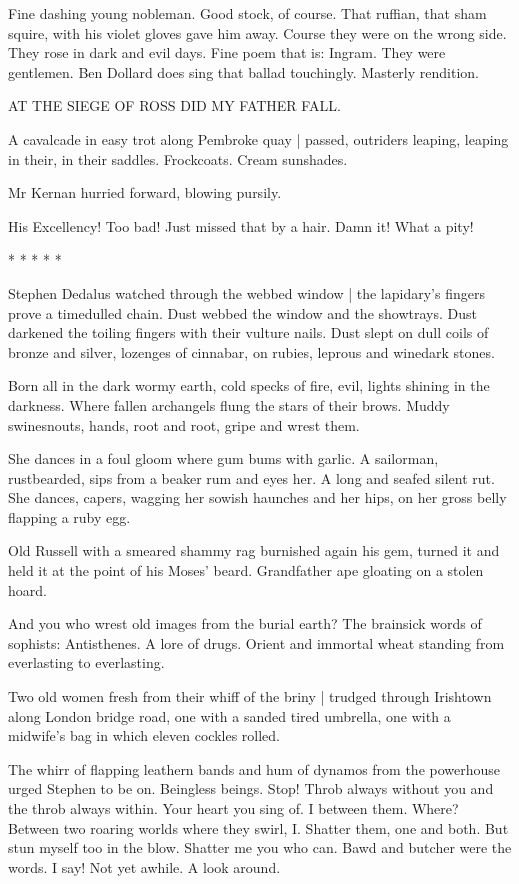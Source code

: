 Fine dashing young nobleman.
Good stock, of course.
That ruffian, that sham squire, with his violet gloves gave him away.
Course they were on the wrong side.
They rose in dark and evil days.
Fine poem that is:
Ingram.
They were gentlemen.
Ben Dollard does sing that ballad touchingly.
Masterly rendition.


    AT THE SIEGE OF ROSS DID MY FATHER FALL.


A cavalcade in easy trot along Pembroke quay |
passed, outriders leaping, leaping in their, in their saddles.
Frockcoats.
Cream sunshades.

Mr Kernan hurried forward, blowing pursily.

His Excellency!
Too bad!
Just missed that by a hair.
Damn it!
What a pity!


    * * * * *


Stephen Dedalus watched through the webbed window |
the lapidary's fingers prove a timedulled chain.
Dust webbed the window and the showtrays.
Dust darkened the toiling fingers with their vulture nails.
Dust slept on dull coils of bronze and silver,
lozenges of cinnabar,
on rubies,
leprous and winedark stones.

Born all in the dark wormy earth,
cold specks of fire,
evil, lights shining in the darkness.
Where fallen archangels flung the stars of their brows.
Muddy swinesnouts,
hands, root and root,
gripe and wrest them.

She dances in a foul gloom where gum bums with garlic.
A sailorman, rustbearded, sips from a beaker rum and eyes her.
A long and seafed silent rut.
She dances, capers,
wagging her sowish haunches and her hips,
on her gross belly flapping a ruby egg.

Old Russell with a smeared shammy rag burnished again his gem,
turned it
and held it at the point of his Moses' beard.
Grandfather ape gloating on a stolen hoard.

And you who wrest old images from the burial earth?
The brainsick words of sophists:
Antisthenes.
A lore of drugs.
Orient and immortal wheat standing from everlasting to everlasting.

Two old women fresh from their whiff of the briny |
trudged through Irishtown along London bridge road,
one with a sanded tired umbrella,
one with a midwife's bag
in which eleven cockles rolled.

The whirr of flapping leathern bands and hum of dynamos from the
powerhouse urged Stephen to be on. Beingless beings. Stop! Throb always
without you and the throb always within. Your heart you sing of. I
between them. Where? Between two roaring worlds where they swirl, I.
Shatter them, one and both. But stun myself too in the blow. Shatter me
you who can. Bawd and butcher were the words. I say! Not yet awhile. A
look around.

